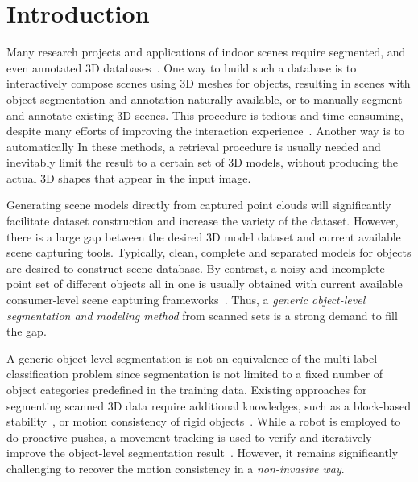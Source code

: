 \section{Introduction}
\label{sec:intro}
Many research projects and applications of indoor scenes require segmented, and even annotated 3D databases~\cite{SearchClassify,SceneFromExample,Fisher:2012:ESO:2366145.2366154,Chen:2014:ASM:2661229.2661239,Fisher:ActivityCentricSceneSynthesis}.
%
One way to build such a database is to interactively compose scenes using 3D meshes for objects, resulting in scenes with object segmentation and annotation naturally available, or to manually segment and annotate existing 3D scenes. This procedure is tedious and time-consuming, despite many efforts of improving the interaction experience~\cite{Merrell:2011:IFL:2010324.1964982, Xu:2013:SSC:2461912.2461968}. 
%
Another way is to automatically   
In these methods, a retrieval procedure is usually needed and inevitably limit the result to a certain set of 3D models, without producing the actual 3D shapes that appear in the input image.

Generating scene models directly from captured point clouds will significantly facilitate dataset construction and increase the variety of the dataset. 
However, there is a large gap between the desired 3D model dataset and current available scene capturing tools. Typically, clean, complete and separated models for objects are desired to construct  scene database. 
By contrast, a noisy and incomplete point set of different objects all in one is usually obtained with current available consumer-level scene capturing frameworks~\cite{KinectFusion, dai2016bundlefusion}. 
Thus, a \emph{generic object-level segmentation and modeling method} from scanned sets is a strong demand to fill the gap.

A generic object-level segmentation is not an equivalence of the multi-label classification problem since segmentation is not limited to a fixed number of object categories predefined in the training data. 
Existing approaches for segmenting scanned 3D data require additional knowledges, such as a block-based stability~\cite{3DReasoningfromBlockstoStability}, or motion consistency of rigid objects~\cite{Xu:2015:ACS:2816795.2818075}. 
While a robot is employed to do proactive pushes, a movement tracking is used to verify and iteratively improve the object-level segmentation result~\cite{Xu:2015:ACS:2816795.2818075}.
However, it remains significantly challenging to recover the motion consistency in a \emph{non-invasive way}. 

